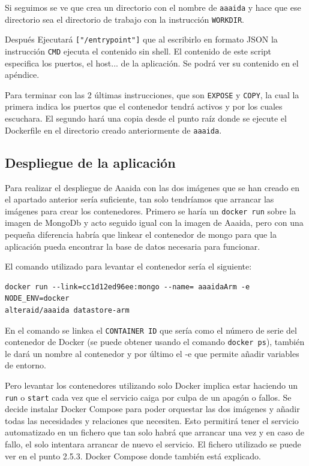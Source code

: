 Si seguimos se ve que crea un directorio con el nombre de \texttt{aaaida} y hace que ese directorio sea el directorio de trabajo con la instrucción \texttt{WORKDIR}.
 
Después Ejecutará \texttt{["/entrypoint"]} que al escribirlo en formato JSON la instrucción \texttt{CMD} ejecuta el contenido sin shell. El contenido de este script especifica los puertos, el host... de la aplicación. Se podrá ver su contenido en el apéndice.
 
Para terminar con las 2 últimas instrucciones, que son \texttt{EXPOSE} y \texttt{COPY}, la cual la primera indica los puertos que el contenedor tendrá activos y por los cuales escuchara. El segundo hará una copia desde el punto raíz donde se ejecute el Dockerfile en el directorio creado anteriormente de \texttt{aaaida}.

\subsection{Despliegue de la aplicación} 

Para realizar el despliegue de Aaaida con las dos imágenes que se han creado en el apartado anterior sería suficiente, tan solo tendríamos que arrancar las imágenes para crear los contenedores. 
Primero se haría un \texttt{docker run} sobre la imagen de MongoDb y acto seguido igual con la imagen de Aaaida, pero con una pequeña diferencia habría que linkear el contenedor de mongo para que la aplicación pueda encontrar la base de datos necesaria para funcionar.
\pagebreak 

El comando utilizado para levantar el contenedor sería el siguiente:

\begin{center}
\begin{verbatim}
docker run --link=cc1d12ed96ee:mongo --name= aaaidaArm -e NODE_ENV=docker 
alteraid/aaaida datastore-arm
\end{verbatim}
\end{center}

En el comando se linkea el \texttt{CONTAINER ID} que sería como el número de serie del contenedor de Docker (se puede obtener usando el comando \texttt{docker ps}), también le dará un nombre al contenedor y por último el -e que permite añadir variables de entorno.
\newline 

Pero levantar los contenedores utilizando solo Docker implica estar haciendo un \texttt{run} o \texttt{start} cada vez que el servicio caiga por culpa de un apagón o fallos. Se decide instalar Docker Compose para poder orquestar las dos imágenes y añadir todas las necesidades y relaciones que necesiten. Esto permitirá tener el servicio automatizado en un fichero que tan solo habrá que arrancar una vez y en caso de fallo, el solo intentara arrancar de nuevo el servicio. El fichero utilizado se puede ver en el punto 2.5.3. Docker Compose donde también está explicado. 

